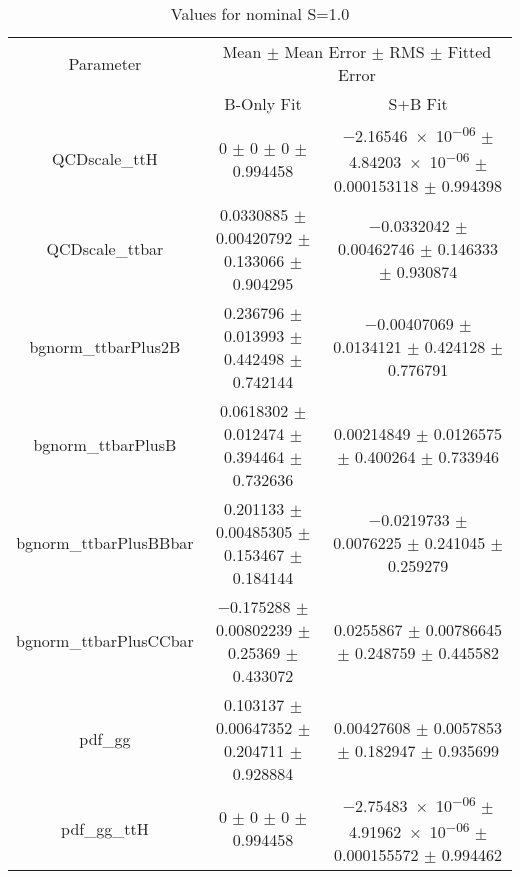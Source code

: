 \begin{table}
\centering
\caption{Values for nominal S=1.0}
\begin{tabular}{ccc}
\toprule
Parameter & \multicolumn{2}{c}{Mean $\pm$ Mean Error $\pm$ RMS $\pm$ Fitted Error}\\
 & B-Only Fit & S+B Fit\\
\midrule
QCDscale\_ttH & \num{0} $\pm$ \num{0} $\pm$ \num{0} $\pm$ \num{0.994458} & \num{-2.16546e-06} $\pm$ \num{4.84203e-06} $\pm$ \num{0.000153118} $\pm$ \num{0.994398}\\
QCDscale\_ttbar & \num{0.0330885} $\pm$ \num{0.00420792} $\pm$ \num{0.133066} $\pm$ \num{0.904295} & \num{-0.0332042} $\pm$ \num{0.00462746} $\pm$ \num{0.146333} $\pm$ \num{0.930874}\\
bgnorm\_ttbarPlus2B & \num{0.236796} $\pm$ \num{0.013993} $\pm$ \num{0.442498} $\pm$ \num{0.742144} & \num{-0.00407069} $\pm$ \num{0.0134121} $\pm$ \num{0.424128} $\pm$ \num{0.776791}\\
bgnorm\_ttbarPlusB & \num{0.0618302} $\pm$ \num{0.012474} $\pm$ \num{0.394464} $\pm$ \num{0.732636} & \num{0.00214849} $\pm$ \num{0.0126575} $\pm$ \num{0.400264} $\pm$ \num{0.733946}\\
bgnorm\_ttbarPlusBBbar & \num{0.201133} $\pm$ \num{0.00485305} $\pm$ \num{0.153467} $\pm$ \num{0.184144} & \num{-0.0219733} $\pm$ \num{0.0076225} $\pm$ \num{0.241045} $\pm$ \num{0.259279}\\
bgnorm\_ttbarPlusCCbar & \num{-0.175288} $\pm$ \num{0.00802239} $\pm$ \num{0.25369} $\pm$ \num{0.433072} & \num{0.0255867} $\pm$ \num{0.00786645} $\pm$ \num{0.248759} $\pm$ \num{0.445582}\\
pdf\_gg & \num{0.103137} $\pm$ \num{0.00647352} $\pm$ \num{0.204711} $\pm$ \num{0.928884} & \num{0.00427608} $\pm$ \num{0.0057853} $\pm$ \num{0.182947} $\pm$ \num{0.935699}\\
pdf\_gg\_ttH & \num{0} $\pm$ \num{0} $\pm$ \num{0} $\pm$ \num{0.994458} & \num{-2.75483e-06} $\pm$ \num{4.91962e-06} $\pm$ \num{0.000155572} $\pm$ \num{0.994462}\\
\bottomrule
\end{tabular}
\end{table}